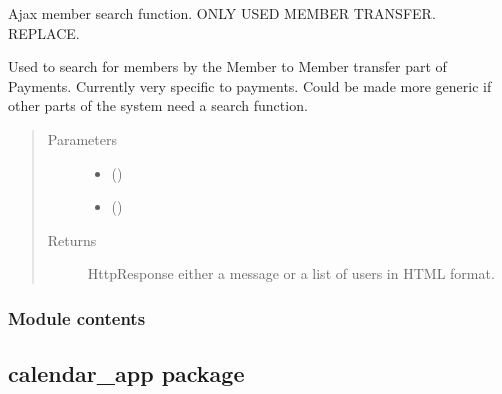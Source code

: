 \documentclass[letterpaper,10pt,english]{sphinxmanual}
\begin{document}

\begin{fulllineitems}
\label{\detokenize{accounts:accounts.views.search_ajax}}
Ajax member search function. ONLY USED MEMBER TRANSFER. REPLACE.

Used to search for members by the Member to Member transfer part of Payments.
Currently very specific to payments. Could be made more generic if other
parts of the system need a search function.
\begin{quote}\begin{description}
\item[{Parameters}] \leavevmode\begin{itemize}
\item {} 
 () \textendash{} 

\item {} 
 () \textendash{} 

\end{itemize}

\item[{Returns}] \leavevmode
HttpResponse \sphinxhyphen{} either a message or a list of users in HTML format.

\end{description}\end{quote}

\end{fulllineitems}



\subsubsection{Module contents}
\label{\detokenize{accounts:module-accounts}}\label{\detokenize{accounts:module-contents}}

\subsection{calendar\_app package}
\label{\detokenize{calendar_app:calendar-app-package}}\label{\detokenize{calendar_app::doc}}
\end{document}
